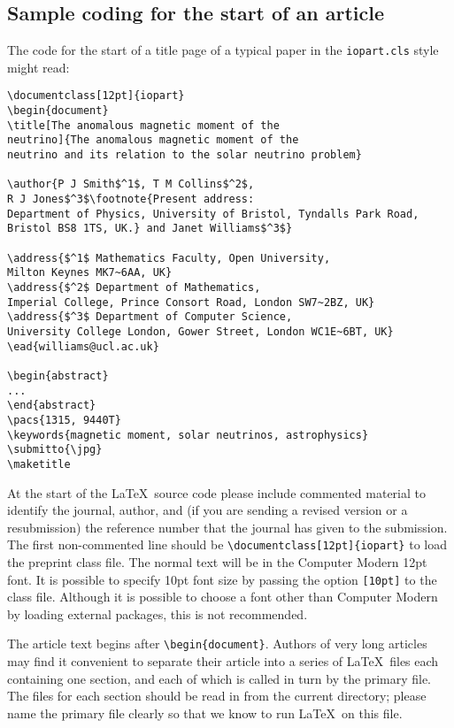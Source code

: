 \documentclass[12pt]{iopart}
\begin{document}
\subsection{Sample coding for the start of an article}
\label{startsample}
The code for the start of a title page of a typical paper in the \verb"iopart.cls" style might read:
\small\begin{verbatim}
\documentclass[12pt]{iopart}
\begin{document}
\title[The anomalous magnetic moment of the 
neutrino]{The anomalous magnetic moment of the 
neutrino and its relation to the solar neutrino problem}

\author{P J Smith$^1$, T M Collins$^2$, 
R J Jones$^3$\footnote{Present address:
Department of Physics, University of Bristol, Tyndalls Park Road, 
Bristol BS8 1TS, UK.} and Janet Williams$^3$}

\address{$^1$ Mathematics Faculty, Open University, 
Milton Keynes MK7~6AA, UK}
\address{$^2$ Department of Mathematics, 
Imperial College, Prince Consort Road, London SW7~2BZ, UK}
\address{$^3$ Department of Computer Science, 
University College London, Gower Street, London WC1E~6BT, UK}
\ead{williams@ucl.ac.uk}

\begin{abstract}
...
\end{abstract}
\pacs{1315, 9440T}
\keywords{magnetic moment, solar neutrinos, astrophysics}
\submitto{\jpg}
\maketitle
\end{verbatim}
\normalsize

At the start of the \LaTeX\ source code please include 
commented material to identify the journal, author, and (if you are sending a revised
version or a resubmission) the reference number that the journal
has given to the submission. The first non-commented line should be 
\verb"\documentclass[12pt]{iopart}"  to load the preprint class 
file.  The normal text will be in the Computer Modern 12pt font.
It is possible to specify 10pt font size by passing the option \verb"[10pt]" to the class file.
Although it is possible to choose a font other than Computer Modern by loading external packages, this is not recommended.

The article text begins after \verb"\begin{document}".
Authors of very long articles may find it convenient to separate 
their article into a series of \LaTeX\ files each containing one section, and each of which is called 
in turn by the primary file.  The files for each section should be read in from the current directory;
please name the primary file clearly so that we know to run \LaTeX\ on this file.
\end{document}
